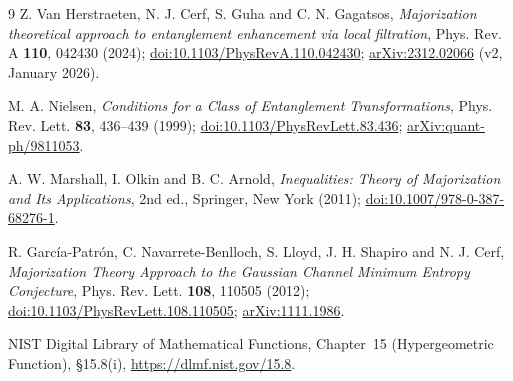 \documentclass[11pt,a4paper]{article}
\theoremstyle{definition}
\theoremstyle{plain}
\begin{document}
\begingroup\small
\begin{thebibliography}{9}
\setlength{\itemsep}{2pt}
Z. Van Herstraeten, N. J. Cerf, S. Guha and C. N. Gagatsos,
\emph{Majorization theoretical approach to entanglement enhancement via local filtration},
Phys. Rev. A \textbf{110}, 042430 (2024);
\href{https://doi.org/10.1103/PhysRevA.110.042430}{doi:10.1103/PhysRevA.110.042430};
\href{https://arxiv.org/abs/2312.02066}{arXiv:2312.02066} (v2, January 2026).

M. A. Nielsen,
\emph{Conditions for a Class of Entanglement Transformations},
Phys. Rev. Lett. \textbf{83}, 436--439 (1999);
\href{https://doi.org/10.1103/PhysRevLett.83.436}{doi:10.1103/PhysRevLett.83.436};
\href{https://arxiv.org/abs/quant-ph/9811053}{arXiv:quant-ph/9811053}.

A. W. Marshall, I. Olkin and B. C. Arnold,
\emph{Inequalities: Theory of Majorization and Its Applications},
2nd ed., Springer, New York (2011);
\href{https://doi.org/10.1007/978-0-387-68276-1}{doi:10.1007/978-0-387-68276-1}.

R. Garc\'ia-Patr\'on, C. Navarrete-Benlloch, S. Lloyd, J. H. Shapiro and N. J. Cerf,
\emph{Majorization Theory Approach to the Gaussian Channel Minimum Entropy Conjecture},
Phys. Rev. Lett. \textbf{108}, 110505 (2012);
\href{https://doi.org/10.1103/PhysRevLett.108.110505}{doi:10.1103/PhysRevLett.108.110505};
\href{https://arxiv.org/abs/1111.1986}{arXiv:1111.1986}.

NIST Digital Library of Mathematical Functions, Chapter~15
(Hypergeometric Function), \S15.8(i),
\href{https://dlmf.nist.gov/15.8}{https://dlmf.nist.gov/15.8}.
\end{thebibliography}
\endgroup
\end{document}

